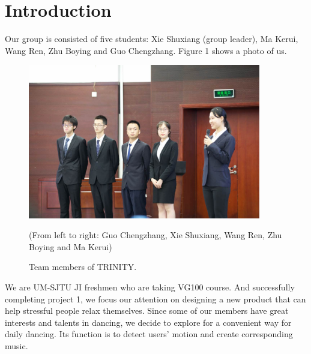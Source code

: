 \section{Introduction}
\par Our group is consisted of five students: Xie Shuxiang (group leader), Ma
Kerui, Wang Ren, Zhu Boying and Guo Chengzhang. Figure 1 shows a photo of us. 
\begin{figure}[H]
    \centering
    \includegraphics[width=4in]{Pics/groupSym}
    \caption{Team members of TRINITY.}
    (From left to right: Guo Chengzhang, Xie Shuxiang, Wang Ren, Zhu Boying and
    Ma Kerui)  
\end{figure}

\par We are UM-SJTU JI freshmen who are taking VG100 course. And successfully
completing project 1, we focus our attention on designing a new product that can
help stressful people relax themselves. Since some of our members have great
interests and talents in dancing, we decide to explore for a convenient way for
daily dancing. Its function is to detect users' motion and create corresponding
music.
